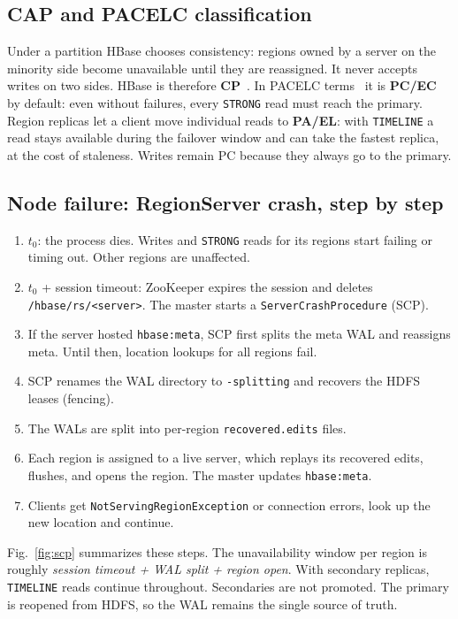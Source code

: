 \documentclass[10pt,twocolumn,letterpaper]{article}
\newcommand{\code}[1]{\texttt{\small #1}}
\begin{document}
\subsection{CAP and PACELC classification}
Under a partition HBase chooses consistency: regions owned by a server on the minority side become unavailable until they are reassigned. It never accepts writes on two sides. HBase is therefore \textbf{CP}~\cite{cap}. In PACELC terms~\cite{pacelc} it is \textbf{PC/EC} by default: even without failures, every \code{STRONG} read must reach the primary. Region replicas let a client move individual reads to \textbf{PA/EL}: with \code{TIMELINE} a read stays available during the failover window and can take the fastest replica, at the cost of staleness. Writes remain PC because they always go to the primary.

\subsection{Node failure: RegionServer crash, step by step}
\begin{enumerate}
\item $t_0$: the process dies. Writes and \code{STRONG} reads for its regions start failing or timing out. Other regions are unaffected.
\item $t_0$ + session timeout: ZooKeeper expires the session and deletes \code{/hbase/rs/<server>}. The master starts a \code{ServerCrashProcedure} (SCP).
\item If the server hosted \code{hbase:meta}, SCP first splits the meta WAL and reassigns meta. Until then, location lookups for all regions fail.
\item SCP renames the WAL directory to \code{-splitting} and recovers the HDFS leases (fencing).
\item The WALs are split into per-region \code{recovered.edits} files.
\item Each region is assigned to a live server, which replays its recovered edits, flushes, and opens the region. The master updates \code{hbase:meta}.
\item Clients get \code{NotServingRegionException} or connection errors, look up the new location and continue.
\end{enumerate}
Fig.~\ref{fig:scp} summarizes these steps. The unavailability window per region is roughly \emph{session timeout + WAL split + region open}. With secondary replicas, \code{TIMELINE} reads continue throughout. Secondaries are not promoted. The primary is reopened from HDFS, so the WAL remains the single source of truth.
\end{document}
